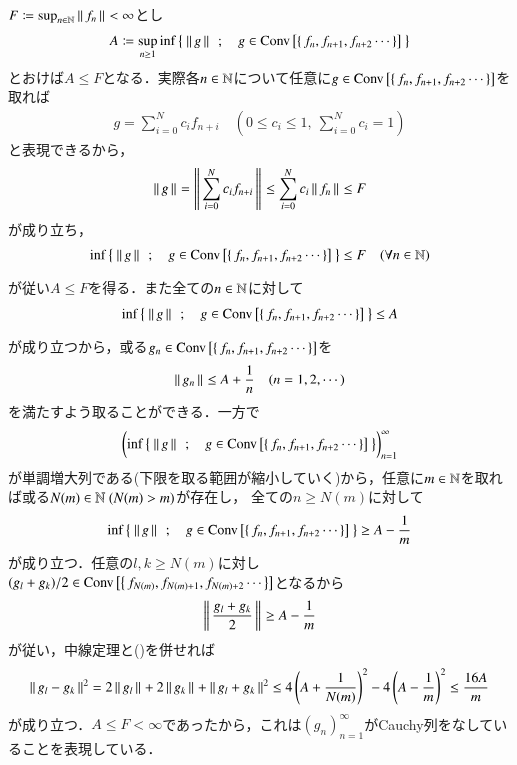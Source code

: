 \begin{prf}
	$F \coloneqq \operatorname*{sup}_{n \in \mathbb{N}} \left\|\, f_n\, \right\|_{} < \infty$とし
	\begin{align}
		A \coloneqq \operatorname*{sup}_{n \geq 1} \operatorname*{inf}_{} \left\{\ \left\|\, g\, \right\|_{}\ \, ; \quad g \in \mathrm{Conv}\left[\left\{\, f_n,f_{n+1},f_{n+2} \cdots \, \right\}\right]\ \right\}
	\end{align}
	とおけば$A \leq F$となる．実際各$n \in \mathbb{N}$について任意に$g \in \mathrm{Conv}\left[\left\{\, f_n,f_{n+1},f_{n+2} \cdots \, \right\}\right]$を取れば
	\begin{align}
		g = \sum_{i=0}^{N}c_i f_{n+i} \quad \left( 0 \leq c_i \leq 1,\ \sum_{i=0}^{N} c_i = 1 \right)
	\end{align}
	と表現できるから，
	\begin{align}
		\left\|\, g\, \right\|_{} = \left\|\, \sum_{i=0}^{N}c_i f_{n+i}\, \right\|_{} \leq \sum_{i=0}^{N}c_i \left\|\, f_n\, \right\|_{} \leq F
	\end{align}
	が成り立ち，
	\begin{align}
		\operatorname*{inf}_{} \left\{\ \left\|\, g\, \right\|_{}\ \, ; \quad g \in \mathrm{Conv}\left[\left\{\, f_n,f_{n+1},f_{n+2} \cdots \, \right\}\right]\ \right\} \leq F \quad (\forall n \in \mathbb{N})
	\end{align}
	が従い$A \leq F$を得る．また全ての$n \in \mathbb{N}$に対して
	\begin{align}
		\operatorname*{inf}_{} \left\{\ \left\|\, g\, \right\|_{}\ \, ; \quad g \in \mathrm{Conv}\left[\left\{\, f_n,f_{n+1},f_{n+2} \cdots \, \right\}\right]\ \right\} \leq A
	\end{align}
	が成り立つから，或る$g_n \in \mathrm{Conv}\left[\left\{\, f_n,f_{n+1},f_{n+2} \cdots \, \right\}\right]$を
	\begin{align}
		\left\|\, g_n\, \right\|_{} \leq A + \frac{1}{n} \quad (n=1,2,\cdots) \label{eq:thm_kolmos_1}
	\end{align}
	を満たすよう取ることができる．一方で
	\begin{align}
		\left( \operatorname*{inf}_{} \left\{\ \left\|\, g\, \right\|_{}\ \, ; \quad g \in \mathrm{Conv}\left[\left\{\, f_n,f_{n+1},f_{n+2} \cdots \, \right\}\right]\ \right\} \right)_{n=1}^\infty
	\end{align}
	が単調増大列である(下限を取る範囲が縮小していく)から，任意に$m \in \mathbb{N}$を取れば或る$N(m) \in \mathbb{N}\ (N(m) > m)$が存在し，
	全ての$n \geq N(m)$に対して
	\begin{align}
		\operatorname*{inf}_{} \left\{\ \left\|\, g\, \right\|_{}\ \, ; \quad g \in \mathrm{Conv}\left[\left\{\, f_n,f_{n+1},f_{n+2} \cdots \, \right\}\right]\ \right\} \geq A - \frac{1}{m}
	\end{align}
	が成り立つ．任意の$l,k \geq N(m)$に対し$(g_l + g_k) / 2 \in \mathrm{Conv}\left[\left\{\, f_{N(m)},f_{N(m)+1},f_{N(m)+2} \cdots \, \right\}\right]$となるから
	\begin{align}
		\left\|\, \frac{g_l + g_k}{2}\, \right\|_{} \geq A - \frac{1}{m}
	\end{align}
	が従い，中線定理と()を併せれば
	\begin{align}
		\left\|\, g_l - g_k\, \right\|_{}^2 = 2\left\|\, g_l\, \right\|_{} + 2\left\|\, g_k\, \right\|_{} + \left\|\, g_l + g_k\, \right\|_{}^2 \leq 4\left( A + \frac{1}{N(m)} \right)^2 - 4\left( A - \frac{1}{m} \right)^2 \leq \frac{16A}{m}
	\end{align}
	が成り立つ．$A \leq F < \infty$であったから，これは$(g_n)_{n=1}^{\infty}$がCauchy列をなしていることを表現している．
	\QED
\end{prf}